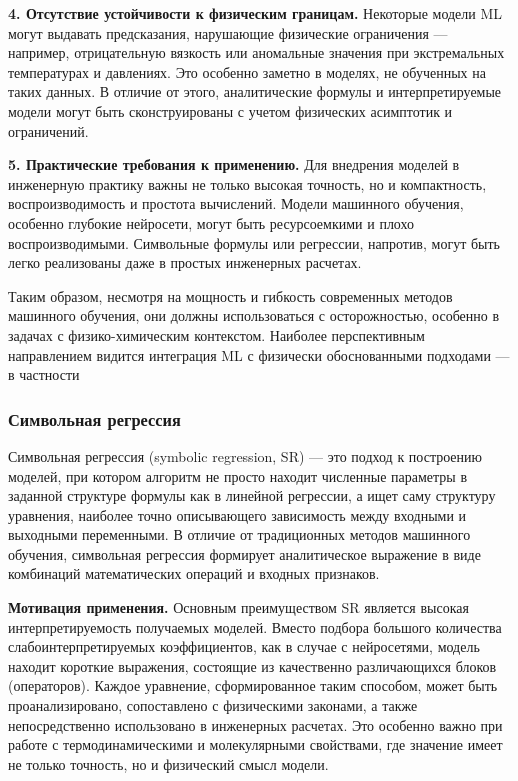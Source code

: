 \documentclass[a4paper,12pt]{article}
\begin{document}
\textbf{4. Отсутствие устойчивости к физическим границам.}
Некоторые модели ML могут выдавать предсказания, нарушающие физические ограничения — например, отрицательную вязкость или аномальные значения при экстремальных температурах и давлениях. Это особенно заметно в моделях, не обученных на таких данных. В отличие от этого, аналитические формулы и интерпретируемые модели могут быть сконструированы с учетом физических асимптотик и ограничений.

\textbf{5. Практические требования к применению.}
Для внедрения моделей в инженерную практику важны не только высокая точность, но и компактность, воспроизводимость и простота вычислений. Модели машинного обучения, особенно глубокие нейросети, могут быть ресурсоемкими и плохо воспроизводимыми. Символьные формулы или регрессии, напротив, могут быть легко реализованы даже в простых инженерных расчетах.

Таким образом, несмотря на мощность и гибкость современных методов машинного обучения, они должны использоваться с осторожностью, особенно в задачах с физико-химическим контекстом. Наиболее перспективным направлением видится интеграция ML с физически обоснованными подходами — в частности

\subsubsection{Символьная регрессия}

Символьная регрессия (symbolic regression, SR) — это подход к построению моделей, при котором алгоритм не просто находит численные параметры в заданной структуре формулы как в линейной регрессии, а ищет саму структуру уравнения, наиболее точно описывающего зависимость между входными и выходными переменными. В отличие от традиционных методов машинного обучения, символьная регрессия формирует аналитическое выражение в виде комбинаций математических операций и входных признаков.

\textbf{Мотивация применения.}
Основным преимуществом SR является высокая интерпретируемость получаемых моделей. Вместо подбора большого количества слабоинтерпретируемых коэффициентов, как в случае с нейросетями, модель находит короткие выражения, состоящие из качественно различающихся блоков (операторов). Каждое уравнение, сформированное таким способом, может быть проанализировано, сопоставлено с физическими законами, а также непосредственно использовано в инженерных расчетах. Это особенно важно при работе с термодинамическими и молекулярными свойствами, где значение имеет не только точность, но и физический смысл модели.
\end{document}
